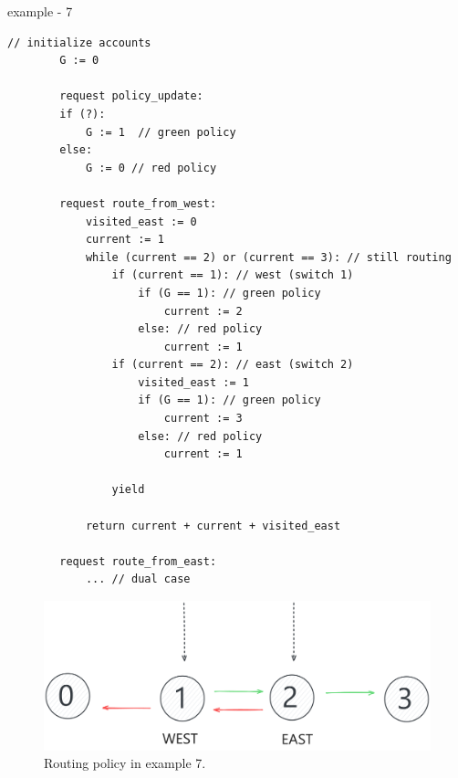 \newpage

example - 7

\begin{minipage}[t]{1.0\textwidth}
	\begin{lstlisting}[caption={BGP (non serializable --- cycles can appear)}]
	    // initialize accounts
	    G := 0
	    
	    request policy_update:
	    if (?):
	        G := 1  // green policy 
	    else:
	        G := 0 // red policy
			
	    request route_from_west:
	        visited_east := 0
	        current := 1
	        while (current == 2) or (current == 3): // still routing        
	            if (current == 1): // west (switch 1)
	                if (G == 1): // green policy
	                    current := 2
	                else: // red policy
	                    current := 1
	            if (current == 2): // east (switch 2)
	                visited_east := 1
	                if (G == 1): // green policy
	                    current := 3
	                else: // red policy
	                    current := 1
	 
	            yield
			
	        return current + current + visited_east
	        
	    request route_from_east:
	        ... // dual case     		        
		\end{lstlisting}
\end{minipage}



\begin{figure}[h]
	\centering
	\includegraphics[width=0.5\linewidth]{plots/east_west_routing.pdf}
	\caption{Routing policy in example 7.}
	\label{fig:pdfimage}
\end{figure}



